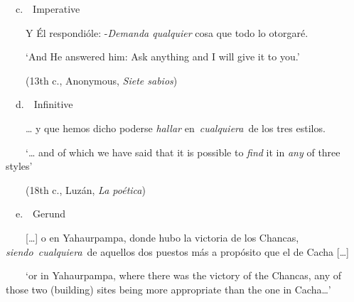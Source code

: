 \begin{styleStandard}
\ \ c.\ \ Imperative
\end{styleStandard}

\begin{styleStandard}
\ \ \ \ Y Él respondióle: -\textit{Demanda qualquier} cosa que todo lo otorgaré. 
\end{styleStandard}

\begin{styleStandard}
\ \ \ \ ‘And He answered him: Ask anything and I will give it to you.’
\end{styleStandard}

\begin{styleStandard}
\ \ \ \ (13th c., Anonymous, \textit{Siete sabios})
\end{styleStandard}

\begin{styleStandard}
\ \ d.\ \ Infinitive
\end{styleStandard}

\begin{styleStandard}
\ \ \ \ … y que hemos dicho poderse \textit{hallar} en~\textit{cualquiera}~de los tres estilos. 
\end{styleStandard}

\begin{styleStandard}
\ \ \ \ ‘… and of which we have said that it is possible to \textit{find} it in \textit{any} of three styles’
\end{styleStandard}

\begin{styleStandard}
\ \ \ \ (18th c., Luzán,\textit{ La poética})
\end{styleStandard}

\begin{styleStandard}
\ \ e.\ \ Gerund
\end{styleStandard}

\begin{styleStandard}
\ \ \ \ […] o en Yahaurpampa, donde hubo la victoria de los Chancas, \textit{siendo~cualquiera}~de aquellos dos puestos más a propósito que el de Cacha […] 
\end{styleStandard}

\begin{styleStandard}
\ \ \ \ ‘or in Yahaurpampa, where there was the victory of the Chancas, any of those two (building) sites being more appropriate than the one in Cacha…’
\end{styleStandard}

